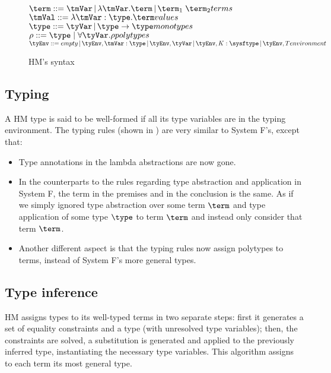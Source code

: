 

\begin{figure}
  \centering
    $\term ::= \tmVar\,|\,\lambda \tmVar.\term\,|\,\term_1 \; \term_2 \hfill terms $\\
  $\tmVal::= \lambda \tmVar:\type.\term \hfill values$\\
  $\type ::= \tyVar\,|\,\type \rightarrow \type \hfill monotypes$\\
  $\rho ::= \type \;|\;\forall \tyVar.\rho \hfill polytypes$\\
  $\tyEnv::=  empty \,|\, \tyEnv, \tmVar:\type\,|\, \tyEnv,\tyVar\,|\, \tyEnv, K : \sysftype \,|\, \tyEnv,T \hfill environment$\\
  \caption{HM's syntax}
  \label{hmsyntax}
\end{figure}

\subsection{Typing}
A HM type is said to be well-formed if all its type variables are in the typing environment. The typing rules (shown in ) are very similar to System F's, except that:
\begin{itemize}
\item Type annotations in the lambda abstractions are now gone.
\item In the counterparts to the rules regarding type abstraction and application in System F, the term in the premises and in the conclusion is the same. As if we simply ignored type abstraction over some term $\term$ and type application of some type $\type$ to term $\term$ and instead only consider that term $\term$.
\item Another different aspect is that the typing rules now assign polytypes to terms, instead of System F's more general types.
\end{itemize}

\subsection{Type inference}
HM assigns types to its well-typed terms in two separate steps: first it generates a set of equality constraints and a type (with unresolved type variables); then, the constraints are solved, a substitution is generated and applied to the previously inferred type, instantiating the necessary type variables. This algorithm assigns to each term its most general type.

